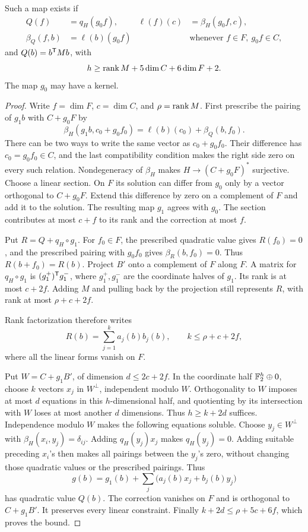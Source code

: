 \begin{lemma}\label{lem:relative-extension}
Such a map exists if
\begin{align*}
 Q(f)&=q_H(g_0f), &
 \ell(f)(c)&=\beta_H(g_0f,c),\\
 \beta_Q(f,b)&=\ell(b)(g_0f)
 &&\text{whenever }f\in F,\ g_0f\in C,
\end{align*}
and \(Q(b)=b^{\mathsf T} Mb\), with
\[
 h\ge\operatorname{rank} M+5\dim C+6\dim F+2.
\]
The map \(g_0\) may have a kernel.
\end{lemma}
\begin{proof}
Write \(f=\dim F\), \(c=\dim C\), and \(\rho=\operatorname{rank} M\).
First prescribe the pairing of \(g_1b\) with \(C+g_0F\) by
\[
 \beta_H(g_1b,c_0+g_0f_0)=\ell(b)(c_0)+\beta_Q(b,f_0).
\]
There can be two ways to write the same vector as \(c_0+g_0 f_0\).
Their difference has \(c_0=g_0 f_0\in C\), and the last compatibility
condition makes the right side zero on every such relation.
Nondegeneracy of \(\beta_H\) makes \(H\to(C+g_0F)^*\) surjective.
Choose a linear section. On \(F\) its solution can differ from \(g_0\)
only by a vector orthogonal to \(C+g_0F\). Extend this difference by
zero on a complement of \(F\) and add it to the solution. The resulting
map \(g_1\) agrees with \(g_0\). The section contributes at most \(c+f\)
to its rank and the correction at most \(f\).

Put \(R=Q+q_H\circ g_1\). For \(f_0\in F\), the prescribed quadratic
value gives \(R(f_0)=0\), and the prescribed pairing with \(g_0 f_0\)
gives \(\beta_R(b,f_0)=0\). Thus \(R(b+f_0)=R(b)\). Project \(B'\)
onto a complement of \(F\) along \(F\). A matrix for \(q_H\circ g_1\) is
\((g_1^+)^{\mathsf T} g_1^-\), where \(g_1^+,g_1^-\) are the coordinate
halves of \(g_1\). Its rank is at most \(c+2f\). Adding \(M\) and
pulling back by the projection still represents \(R\), with rank at
most \(\rho+c+2f\).

Rank factorization therefore writes
\[
 R(b)=\sum_{j=1}^k a_j(b)b_j(b),\qquad k\le\rho+c+2f,
\]
where all the linear forms vanish on \(F\).

Put \(W=C+g_1B'\), of dimension \(d\le2c+2f\).
In the coordinate half \(\mathbb F_2^h\oplus0\), choose \(k\) vectors \(x_j\)
in \(W^\perp\), independent modulo \(W\). Orthogonality to \(W\) imposes at most \(d\) equations in this
\(h\)-dimensional half, and quotienting by its intersection with \(W\)
loses at most another \(d\) dimensions. Thus \(h\ge k+2d\) suffices.
Independence modulo \(W\) makes the following equations soluble. Choose
\(y_j\in W^\perp\) with \(\beta_H(x_i,y_j)=\delta_{ij}\).
Adding \(q_H(y_j)x_j\) makes \(q_H(y_j)=0\). Adding suitable preceding
\(x_i\)'s then makes all pairings between the \(y_j\)'s zero, without
changing those quadratic values or the prescribed pairings.
Thus
\[
 g(b)=g_1(b)+\sum_j\bigl(a_j(b)x_j+b_j(b)y_j\bigr)
\]
has quadratic value \(Q(b)\). The correction vanishes on \(F\) and is
orthogonal to \(C+g_1B'\). It preserves every linear constraint.
Finally \(k+2d\le\rho+5c+6f\), which proves the bound.
\end{proof}

